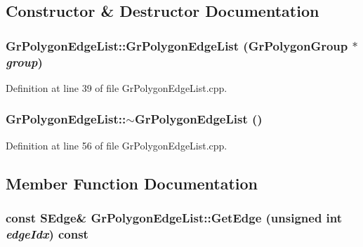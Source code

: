 \subsection{Constructor \& Destructor Documentation}
\hypertarget{class_gr_polygon_edge_list_92c9be118f3b13c157c5e3912ce163d2}{
\subsubsection[{GrPolygonEdgeList}]{\setlength{\rightskip}{0pt plus 5cm}GrPolygonEdgeList::GrPolygonEdgeList ({\bf GrPolygonGroup} $\ast$ {\em group})}}
\label{class_gr_polygon_edge_list_92c9be118f3b13c157c5e3912ce163d2}




Definition at line 39 of file GrPolygonEdgeList.cpp.\hypertarget{class_gr_polygon_edge_list_549338e6b0dbcabfdae3ae0b5b909969}{
\subsubsection[{$\sim$GrPolygonEdgeList}]{\setlength{\rightskip}{0pt plus 5cm}GrPolygonEdgeList::$\sim$GrPolygonEdgeList ()}}
\label{class_gr_polygon_edge_list_549338e6b0dbcabfdae3ae0b5b909969}




Definition at line 56 of file GrPolygonEdgeList.cpp.

\subsection{Member Function Documentation}
\hypertarget{class_gr_polygon_edge_list_1d41a367bd17a6953fb253347d3d8588}{
\subsubsection[{GetEdge}]{\setlength{\rightskip}{0pt plus 5cm}const {\bf SEdge}\& GrPolygonEdgeList::GetEdge (unsigned int {\em edgeIdx}) const}}
\label{class_gr_polygon_edge_list_1d41a367bd17a6953fb253347d3d8588}




